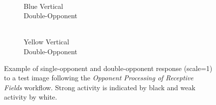 \documentclass[journal,onecolumn]{IEEEtran}
\begin{document}
\begin{figure}[h]
\begin{subfigure}{0.15\textwidth}
        \caption{\\ Blue Vertical\\ Double-Opponent}
    \end{subfigure}
    \begin{subfigure}{0.15\textwidth}
        \centering
        \captionsetup{justification=centering}
        \caption{\\ Yellow Vertical\\ Double-Opponent}
    \end{subfigure}%
    \caption{Example of single-opponent and double-opponent response (scale=1) to a test image following the \textit{Opponent Processing of Receptive Fields} workflow. Strong activity is indicated by black and weak activity by white.}
    \label{fig:blur-effect}
\end{figure}
\end{document}
